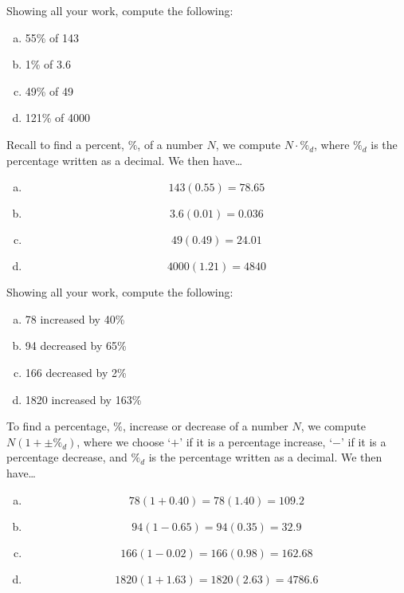 \documentclass[11pt,letterpaper]{article}
\begin{document}

 Showing all your work, compute the following:
	\begin{enumerate}[(a)]
	\item 55\% of 143
	\item 1\% of 3.6
	\item 49\% of 49
	\item 121\% of 4000
	\end{enumerate} \pspace

\sol Recall to find a percent, $\%$, of a number $N$, we compute $N \cdot \%_d$, where $\%_d$ is the percentage written as a decimal. We then have\dots \pspace
	\begin{enumerate}[(a)]
	\item 
		\[
		143(0.55)= 78.65
		\] \pspace
	
	\item 
		\[
		3.6(0.01)= 0.036
		\] \pspace
	
	\item 
		\[
		49(0.49)= 24.01
		\] \pspace
	
	\item 
		\[
		4000(1.21)= 4840
		\]
	\end{enumerate}



\newpage



 Showing all your work, compute the following:
	\begin{enumerate}[(a)]
	\item 78 increased by 40\%
	\item 94 decreased by 65\%
	\item 166 decreased by 2\%
	\item 1820 increased by 163\%
	\end{enumerate} \pspace

\sol To find a percentage, $\%$, increase or decrease of a number $N$, we compute $N(1 + \pm \%_d)$, where we choose `$+$' if it is a percentage increase, `$-$' if it is a percentage decrease, and $\%_d$ is the percentage written as a decimal. We then have\dots \pspace
	\begin{enumerate}[(a)]
	\item 
		\[
		78 (1 + 0.40)= 78(1.40)= 109.2
		\] \pspace
	
	\item 
		\[
		94(1 - 0.65)= 94(0.35)= 32.9
		\] \pspace
	
	\item 
		\[
		166(1 - 0.02)= 166(0.98)= 162.68
		\] \pspace
	
	\item 
		\[
		1820(1 + 1.63)= 1820(2.63)= 4786.6
		\]
	\end{enumerate}
\end{document}
